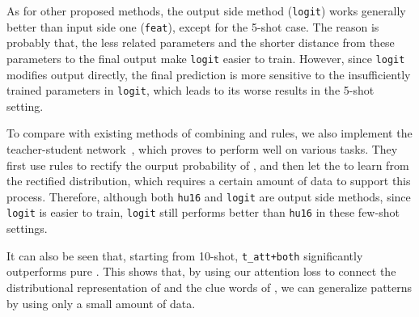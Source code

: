 As for other proposed methods, the output side method (\texttt{logit}) works generally better than input side one (\texttt{feat}), except for the 5-shot case.
The reason is probably that, the less \RE related parameters and the shorter distance from these parameters to the final output make \texttt{logit} easier to train.
However, since \texttt{logit} modifies output directly, the final prediction is more sensitive to the insufficiently trained parameters in \texttt{logit}, which leads to its worse results in the 5-shot setting.

To compare with existing methods of combining \NN and rules, we also implement the  teacher-student network~\cite{hu2016harnessing}, which proves to perform well on various tasks.
They first use \FOL rules to rectify the ourput probability of \NN, and then let the \NN to learn from the rectified distribution, which requires a certain amount of data to support this process.
Therefore, although both \texttt{hu16} and \texttt{logit} are output side methods, since \texttt{logit} is easier to train,
\texttt{logit} still performs better than \texttt{hu16} in these few-shot settings.


It can also be seen that, starting from 10-shot, \texttt{t\_att+both} significantly outperforms pure \RE.
This shows that, by using our attention loss to connect the distributional representation of \NN and the clue words of \RE, we can generalize \RE patterns by using only a small amount of data.


